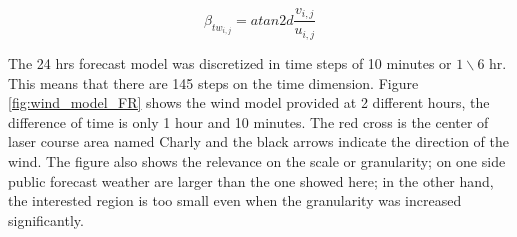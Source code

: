 \begin{equation}\label{eq:b_tw}
    \beta_{tw_{i,j}}= atan2d \frac {v_{i,j}}{u_{i,j}}
\end{equation}

The 24 hrs forecast model was discretized in time steps of 10 minutes or ${1} \backslash {6}$ hr. This means that there are 145 steps on the time dimension. Figure \ref{fig:wind_model_FR} shows the wind model provided at 2 different hours, the difference of time is only 1 hour and 10 minutes. The red cross is the center of laser course area named Charly and the black arrows indicate the direction of the wind. The figure also shows the relevance on the scale or granularity; on one side public forecast weather are larger than the one showed here; in the other hand, the interested region is too small even when the granularity was increased significantly. \par    

